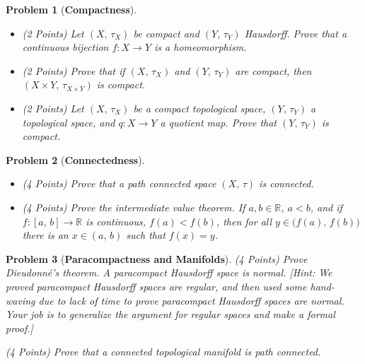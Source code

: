 \documentclass{article}
\theoremstyle{normal}
\newtheorem{problem}{Problem}
\begin{document}
    \clearpage
    \begin{problem}[\textbf{Compactness}]
        \par\hfill\par\vspace{2em}
        \begin{itemize}
            \item
            (2 Points) Let $(X,\,\tau_{X})$ be compact and
            $(Y,\,\tau_{Y})$ Hausdorff. Prove that a continuous bijection
            $f:X\rightarrow{Y}$ is a homeomorphism.
            \item
            (2 Points)
            Prove that if $(X,\,\tau_{X})$ and $(Y,\,\tau_{Y})$ are
            compact, then $(X\times{Y},\,\tau_{X\times{Y}})$ is compact.
            \item
            (2 Points)
            Let $(X,\,\tau_{X})$ be a compact topological space,
            $(Y,\,\tau_{Y})$ a topological space, and $q:X\rightarrow{Y}$ a
            quotient map. Prove that $(Y,\,\tau_{Y})$ is compact.
        \end{itemize}
    \end{problem}
    \clearpage
    \begin{problem}[\textbf{Connectedness}]
        \par\hfill\par\vspace{2em}
        \begin{itemize}
            \item
            (4 Points)
            Prove that a path connected space $(X,\,\tau)$ is connected.
            \item
            (4 Points)
            Prove the intermediate value theorem. If
            $a,b\in\mathbb{R}$, $a<b$, and if $f:[a,\,b]\rightarrow\mathbb{R}$
            is continuous, $f(a)<f(b)$, then for all
            $y\in\big(f(a),\,f(b)\big)$ there is an $x\in(a,\,b)$ such that
            $f(x)=y$.
        \end{itemize}
    \end{problem}
    \clearpage
    \begin{problem}[\textbf{Paracompactness and Manifolds}]
        \item
        (4 Points)
        Prove Dieudonn\'{e}'s theorem. A paracompact Hausdorff space is normal.
        [Hint: We proved paracompact Hausdorff spaces are regular, and then
        used some \textit{hand-waving} due to lack of time to prove paracompact
        Hausdorff spaces are normal. Your job is to generalize the argument for
        regular spaces and make a formal proof.]
        \item
        (4 Points)
        Prove that a connected topological manifold is path connected.
    \end{problem}
\end{document}

